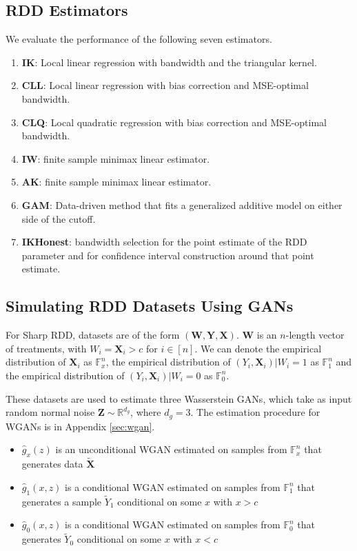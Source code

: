 \documentclass[12pt]{article}
\theoremstyle{definition}
\begin{document}
\subsection{RDD Estimators} 

We evaluate the performance of the following seven estimators. 

\begin{enumerate} 
\item  \textbf{IK}: Local linear regression with \citet{imbens2012optimal} bandwidth and the triangular kernel. 
\item \textbf{CLL}: Local linear regression with \citet{calonico2014robust} bias correction and MSE-optimal bandwidth. 
\item \textbf{CLQ}: Local quadratic regression with \citet{calonico2014robust} bias correction and MSE-optimal bandwidth. 
\item \textbf{IW}: \citet{imbens2019optimized} finite sample minimax linear estimator. 
\item \textbf{AK}: \citet{armstrong2018optimal} finite sample minimax linear estimator. 
\item \textbf{GAM}: Data-driven method that fits a generalized additive model \citep{wood2017generalized} on either side of the cutoff. 
\item \textbf{IKHonest}: \citet{imbens2012optimal} bandwidth selection for the point estimate of the RDD parameter and \citet{imbens2019optimized} for confidence interval construction around that point estimate. 
\end{enumerate} 

\subsection{Simulating RDD Datasets Using GANs} 

For Sharp RDD, datasets are of the form $(\bm W, \bm Y, \bm X)$. $\bm W$ is an $n$-length vector of treatments, with $W_i = \bm X_i > c$ for $i \in [n]$. We can denote the empirical distribution of $\bm X_i$ as $\mathbb F^n_x$, the empirical distribution of $(Y_i, \bm X_i )| W_i = 1$ as $\mathbb F^n_{1}$ and the empirical distribution of $(Y_i, \bm X_i) | W_i = 0$ as $\mathbb F^n_{0}$.  

These datasets are used to estimate three Wasserstein GANs, which take as input random normal noise $\bm Z \sim \mathbb R^{d_g}$, where $d_g = 3$. The estimation procedure for WGANs is in Appendix \ref{sec:wgan}. 
\begin{itemize} 
\item $\hat g_x(z)$ is an unconditional WGAN estimated on samples from $\mathbb F^n_x$ that generates data $\tilde {\bm X}$
\item $\hat g_1(x, z)$ is a conditional WGAN estimated on samples from $ \mathbb F^n_{1}$  that generates a sample ${\tilde Y_1}$ conditional on some $x$ with $x>c$ 
\item $\hat g_0(x, z)$ is a conditional WGAN estimated on samples from $\mathbb F^n_{0}$  that generates ${\tilde Y_0}$ conditional on some $x$ with $x< c$ \end{itemize} 
\end{document}
